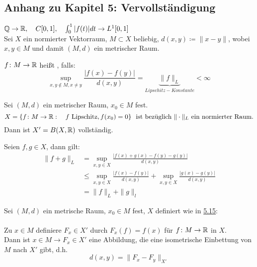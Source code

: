 \subsection*{Anhang zu Kapitel 5: Vervollständigung}

$\mathbb{Q} \rightarrow \mathbb{R}, \quad C[0, 1], \quad \int_{0}^{1} |f(t)| dt \rightarrow L^{1}[0, 1]$ \\
Sei $X$ ein normierter Vektorraum, $M \subset X$ beliebig, $d(x, y) \coloneqq \| x - y \|$, wobei $x, y \in M$ und damit $(M, d)$ ein metrischer Raum.


\begin{definition} \label{def:5.15-Lipschitz}
	$f \colon M \rightarrow \mathbb{R}$ hei{\ss}t , falls:
	\[ \sup_{x, y \notin M, x \neq y} \frac{|f(x) - f(y)|}{d(x, y)} = \underbrace{\| f \|_{L}}_{Lipschitz-Konstante} < \infty \]
\end{definition}


\begin{bemerkung}
	Sei $(M, d)$ ein metrischer Raum, $x_{0} \in M$ fest. \\
	\[ X = \{ f \colon M \rightarrow \MdR: \quad f \text{ Lipschitz}, f(x_{0}) = 0 \} \text{ ist bezüglich } \| \cdot \|_{L} \text{ ein normierter Raum.} \]	
	Dann ist $X' = B(X, \mathbb{R})$ vollständig.
	\begin{beweis}
		Seien $f, g \in X$, dann gilt:  
		\begin{align*}
			\| f + g \|_{L} & = \sup_{x, y \in X} \frac{|f(x) + g(x) - f(y) - g(y)|}{d(x, y)} \\
							& \leq \sup_{x, y \in X} \frac{|f(x) - f(y)|}{d(x, y)} + \sup_{x, y \in X} \frac{|g(x) - g(y)|}{d(x, y)} \\
							& = \| f \|_{L} + \| g \|_{l} 			
		\end{align*} 
	\end{beweis}
\end{bemerkung}


\begin{satz} \label{satz:5-17}
	Sei $(M,d)$ ein metrische Raum, $x_{0} \in M$ fest, $X$ definiert wie in \hyperref[def:5.15-Lipschitz]{5.15}: \\ \\
	Zu $x \in M$ definiere $F_{x} \in X'$ durch $F_{x}(f) = f(x)$ für $f \colon M \rightarrow \mathbb{R}$ in $X$. \\
	Dann ist $x \in M \rightarrow F_{x} \in X'$ eine Abbildung, die eine isometrische Einbettung von $M$ nach $X'$ gibt, d.h. 
	\[ d(x, y) = \| F_{x} - F_{y} \|_{X'} \]
\end{satz}

